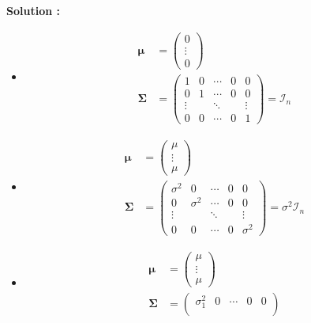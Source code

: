 \documentclass[letter, 11pt]{article}
\newcommand{\prof}[1]{\begin{professeur}\color{blue} {\bf Solution :} #1 \end{professeur}}
\newcommand{\bo}[1]{\boldsymbol#1}
\begin{document}
\begin{enumerate}[leftmargin=*, wide, label=\bf Exercice \arabic*:]
\prof{
\begin{itemize}
    \item[(a)] \begin{align*}
        \bo\mu
        &= \begin{pmatrix}
            0 \\[4mm]
            \vdots \\[4mm]
            0
        \end{pmatrix}\\
        \bo\Sigma
        &= \begin{pmatrix}
            1 & 0 & \cdots & 0 & 0 \\[4mm]
            0 & 1 & \cdots & 0 & 0 \\[4mm]
            \vdots & & \ddots & & \vdots \\[4mm]
            0 & 0 & \cdots & 0 & 1
        \end{pmatrix} = \mathcal{I}_n
    \end{align*}
    \item[(b)] \begin{align*}
        \bo\mu
        &= \begin{pmatrix}
            \mu \\[4mm]
            \vdots \\[4mm]
            \mu
        \end{pmatrix}\\
        \bo\Sigma
        &=  \begin{pmatrix}
            \sigma^2 & 0 & \cdots & 0 & 0 \\[4mm]
            0 & \sigma^2 & \cdots & 0 & 0 \\[4mm]
            \vdots & & \ddots & & \vdots \\[4mm]
            0 & 0 & \cdots & 0 & \sigma^2
        \end{pmatrix} = \sigma^2\mathcal{I}_n
    \end{align*}
     \item[(c)] \begin{align*}
        \bo\mu
        &= \begin{pmatrix}
            \mu \\[4mm]
            \vdots \\[4mm]
            \mu
        \end{pmatrix}\\
        \bo\Sigma
        &=  \begin{pmatrix}
            \sigma_1^2 & 0 & \cdots & 0 & 0 \\[4mm]

\end{pmatrix}
\end{align*}
\end{itemize}}
\end{enumerate}
\end{document}
